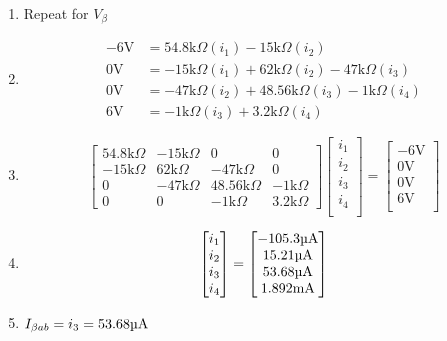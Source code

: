 \documentclass[12pt]{article}
\def\k{\mathrm{k}}
\def\V{\mathrm{V}}
\def\A{\mathrm{A}}
\def\m{\mathrm{m}}
\def\u{\textrm{\textmu}}
\begin{document}
\begin{enumerate}
	\item Repeat for $V_\beta$
	\item \begin{align*}
		      -6\V & =54.8\k\Omega(i_1)-15\k\Omega(i_2)                  \\
		      0\V  & =-15\k\Omega(i_1)+62\k\Omega(i_2)-47\k\Omega(i_3)   \\
		      0\V  & =-47\k\Omega(i_2)+48.56\k\Omega(i_3)-1\k\Omega(i_4) \\
		      6\V  & =-1\k\Omega(i_3)+3.2\k\Omega(i_4)
	      \end{align*}
	\item \[
		      \begin{bmatrix}
			      54.8\k\Omega & -15\k\Omega & 0             & 0           \\
			      -15\k\Omega  & 62\k\Omega  & -47\k\Omega   & 0           \\
			      0            & -47\k\Omega & 48.56\k\Omega & -1\k\Omega  \\
			      0            & 0           & -1\k\Omega    & 3.2\k\Omega
		      \end{bmatrix}
		      \begin{bmatrix}
			      i_1 \\
			      i_2 \\
			      i_3 \\
			      i_4 \\
		      \end{bmatrix}
		      =
		      \begin{bmatrix}
			      -6\V \\
			      0\V  \\
			      0\V  \\
			      6\V  \\
		      \end{bmatrix}
	      \]
	\item \[
		      \begin{bmatrix}
			      i_1 \\
			      i_2 \\
			      i_3 \\
			      i_4 \\
		      \end{bmatrix}
		      =
		      \begin{bmatrix}
			      -105.3\u\A \\
			      15.21\u\A  \\
			      53.68\u\A  \\
			      1.892\m\A  \\
		      \end{bmatrix}
	      \]
	\item $I_{\beta ab}=i_3=53.68\u\A$
\end{enumerate}
\end{document}
